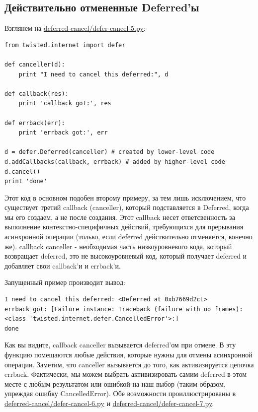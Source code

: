     
\subsection{Действительно отмененные Deferred'ы}

Взглянем на 
\href{http://github.com/jdavisp3/twisted-intro/blob/master/deferred-cancel/defer-cancel-5.py#L1}{deferred-cancel/defer-cancel-5.py}:

\begin{scriptsize}\begin{verbatim}
from twisted.internet import defer

def canceller(d):
    print "I need to cancel this deferred:", d

def callback(res):
    print 'callback got:', res

def errback(err):
    print 'errback got:', err

d = defer.Deferred(canceller) # created by lower-level code
d.addCallbacks(callback, errback) # added by higher-level code
d.cancel()
print 'done'
\end{verbatim}\end{scriptsize}


Этот код в основном подобен второму примеру, 
за тем лишь исключением, что существует третий 
callback (canceller), который подставляется в Deferred, 
когда мы его создаем, а не после создания. Этот callback 
несет ответсвенность за выполнение контекстно-специфичных 
действий, требующихся для прерывания асинхронной операции (только, 
если deferred действительно отменяется, конечно же). callback 
canceller - необходимая часть низкоуровневого кода, 
который возвращает deferred, это не высокоуровневый код, 
который получает deferred и добавляет свои callback'и и errback'и.


Запущенный пример производит вывод:

\begin{scriptsize}\begin{verbatim}
I need to cancel this deferred: <Deferred at 0xb7669d2cL>
errback got: [Failure instance: Traceback (failure with no frames): 
<class 'twisted.internet.defer.CancelledError'>:]
done
\end{verbatim}\end{scriptsize}


Как вы видите, callback canceller вызывается deferred'ом при
отмене. В эту функцию помещаются любые действия, которые 
нужны для отмены асинхронной операции. Заметим, что canceller 
вызывается до того, как активизируется цепочка errback. Фактически, 
мы можем выбрать активизировать самим deferred в этом месте с 
любым результатом или ошибкой на наш выбор (таким образом, 
упреждая ошибку CancelledError). Обе возможности проиллюстрированы 
в \href{http://github.com/jdavisp3/twisted-intro/blob/master/deferred-cancel/defer-cancel-6.py#L1}{deferred-cancel/defer-cancel-6.py} и 
\href{http://github.com/jdavisp3/twisted-intro/blob/master/deferred-cancel/defer-cancel-7.py#L1}{deferred-cancel/defer-cancel-7.py}.


